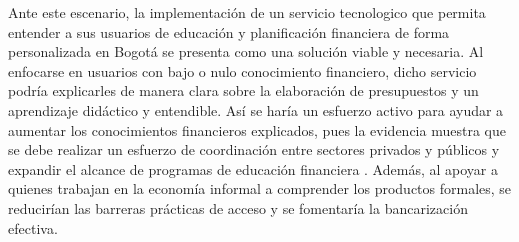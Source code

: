 Ante este escenario, la implementación de un servicio tecnologico que permita entender a sus usuarios de educación y planificación financiera de forma personalizada en Bogotá se presenta como una solución viable y necesaria. Al enfocarse en usuarios con bajo o nulo conocimiento financiero, dicho servicio podría explicarles de manera clara sobre la elaboración de presupuestos y un aprendizaje didáctico y entendible. Así se haría un esfuerzo activo para ayudar a aumentar los conocimientos financieros explicados, pues la evidencia muestra que se debe realizar un esfuerzo de coordinación entre sectores privados y públicos y expandir el alcance de programas de educación financiera \parencite[p.~7]{Departamento01}. Además, al apoyar a quienes trabajan en la economía informal a comprender los productos formales, se reducirían las barreras prácticas de acceso y se fomentaría la bancarización efectiva.
